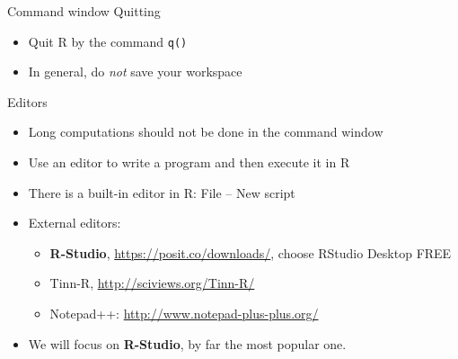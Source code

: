 \documentclass[aspectratio=169]{beamer}
\begin{document}
\begin{frame}{Command window}
Quitting
\begin{itemize}
    \item Quit R by the command \texttt{q()}
    \item In general, do \emph{not} save your workspace
\end{itemize}
\end{frame}

\begin{frame}{Editors}
\begin{itemize}
    \item Long computations should not be done in the command window\smallskip
    \item Use an editor to write a program and then execute it in R\smallskip
    \item There is a built-in editor in R: File -- New script\smallskip
    \item External editors:
    \begin{itemize}
        \item[$\bullet$] \textbf{R-Studio}, \url{https://posit.co/downloads/}, choose RStudio Desktop FREE
        \item[$\bullet$] Tinn-R, \url{http://sciviews.org/Tinn-R/}
        \item[$\bullet$] Notepad++: \url{http://www.notepad-plus-plus.org/}\smallskip
    \end{itemize}
    \item We will focus on \textbf{R-Studio}, by far the most popular one.
\end{itemize}
\end{frame}
\end{document}

